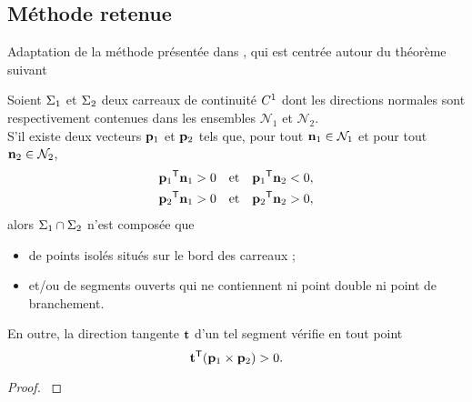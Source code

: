\subsection{Méthode retenue}
Adaptation de la méthode présentée dans \cite{hohmeyer1992}, qui est centrée autour du théorème suivant

\begin{theoreme}[Hohmeyer]
	\label{theo:detection_boucles_hohmeyer}
	Soient $\Sigma_1$ et $\Sigma_2$ deux carreaux de continuité $C^{1}$ dont les directions normales sont respectivement contenues dans les ensembles $\mathcal{N}_1$ et $\mathcal{N}_2$. \\
	S'il existe deux vecteurs $\mathbf{p}_1$ et $\mathbf{p}_2$ tels que, 
	pour tout $\mathbf{n}_1 \in \mathcal{N}_1$ et pour tout $\mathbf{n}_2 \in \mathcal{N}_2$,
	\begin{align}
		{ \mathbf{p}_1 } ^\mathsf{T} { \mathbf{n}_1 } > 0 &\text{\quad et\quad} { \mathbf{p}_1 } ^\mathsf{T} { \mathbf{n}_2 } < 0, \label{eq:hohmeyer_separation}\\
		{ \mathbf{p}_2 } ^\mathsf{T} { \mathbf{n}_1 } > 0 &\text{\quad et\quad} { \mathbf{p}_2 } ^\mathsf{T} { \mathbf{n}_2 } > 0, \label{eq:hohmeyer_hemisphere}
	\end{align}
	alors $\Sigma_1 \cap \Sigma_2$ n'est composée que 
	\begin{itemize}
		\item de points isolés situés sur le bord des carreaux ;
		\item et/ou de segments ouverts qui ne contiennent ni point double ni point de branchement.%
	\end{itemize}
	En outre, la direction tangente $\mathbf{t}$ d'un tel segment vérifie en tout point
	\begin{equation}
		{ \mathbf{t}} ^\mathsf{T} { ({ \mathbf{p}_1 } \times { \mathbf{p}_2 }) } > 0. \label{eq:hohmeyer_monotone}
	\end{equation}
\end{theoreme}


\begin{proof}
	\cf \cite[Théorème~4]{hohmeyer1992}
\end{proof}



